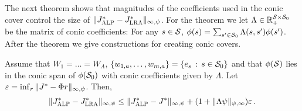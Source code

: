 \documentclass[12pt,draftcls,onecolumn]{IEEEtran}
\begin{document}
The next theorem shows that magnitudes of the coefficients used in the conic cover control the size of 
$\norm{\Jalpo-\Jlro}_{\infty,\psi}$. 
For the theorem we let $\Lambda\in \Re_+^{\S\times \S_0}$ be the matrix of conic coefficients: 
For any $s\in \S$, $\phi(s) = \sum_{s'\in \S_0} \Lambda(s,s') \phi(s')$. After the theorem we give constructions 
for creating conic covers.
\begin{theorem}
\label{conetheorm}
Assume that $W_1 = \dots = W_A$, $\{w_{1,a},\dots,w_{m,a}\} = \{ e_s\,:\, s\in \S_0 \}$ 
and that $\phi(\S)$ lies in the conic span of $\phi(\S_0)$ with conic coefficients given by $\Lambda$.
Let $\epsilon = \inf_{r}\norm{ J^* -  \Phi r }_{\infty,\psi}$.
Then, 
\begin{align*}
\norm{\Jalpo-\Jlro}_{\infty,\psi}
\le 
\norm{\Jalpo-J^*}_{\infty,\psi} + (1+ \norm{\Lambda \psi}_{\psi,\infty}) \epsilon\,.
\end{align*}
\end{theorem}
\end{document}
